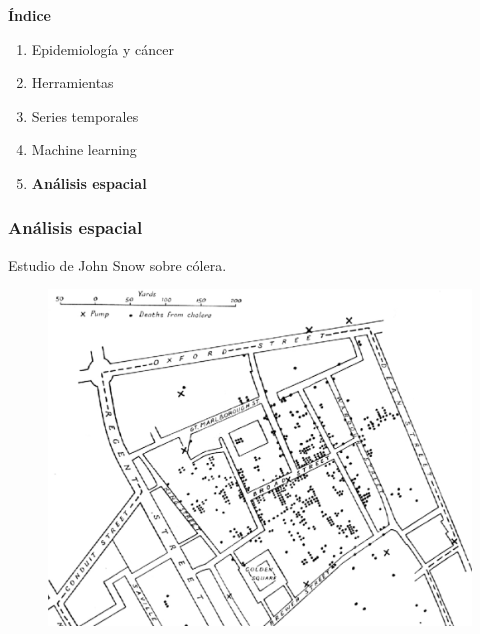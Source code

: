 \documentclass{beamer}
\begin{document}
\begin{frame}\frametitle{}
	
	\Large{\textbf{Índice}}\\[2ex]
	\normalsize
	\begin{enumerate}
		\item Epidemiología y cáncer\\[2ex]
		\item Herramientas\\[2ex]
		\item Series temporales \\[2ex]
		\item Machine learning \\[2ex]
		\item \textbf{Análisis espacial} \\[2ex]
	\end{enumerate}
	
\end{frame}


\begin{frame}\frametitle{Análisis espacial}
	\centering Estudio de John Snow sobre cólera.
	\begin{figure}
		\centering
		\includegraphics[width=.75\textwidth]{images/mapa_3.png}
	\end{figure}
\end{frame}
\end{document}

